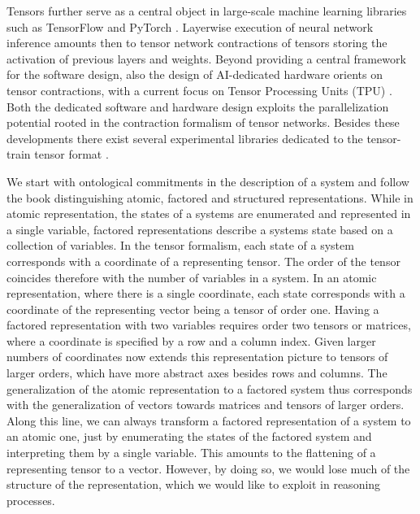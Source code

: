 Tensors further serve as a central object in large-scale machine learning libraries such as TensorFlow \cite{abadi_tensorflow_2016} and PyTorch \cite{paszke_pytorch_2019}.
Layerwise execution of neural network inference amounts then to tensor network contractions of tensors storing the activation of previous layers and weights.
Beyond providing a central framework for the software design, also the design of AI-dedicated hardware orients on tensor contractions, with a current focus on Tensor Processing Units (TPU) \cite{nikolic_survey_2022,jouppi_tpu_2023}.
Both the dedicated software and hardware design exploits the parallelization potential rooted in the contraction formalism of tensor networks.
Besides these developments there exist several experimental libraries dedicated to the tensor-train tensor format \cite{suess_mpnum_2017,wolf_libxerusxerus_2024,gels_pgelssscikit_tt_2025,puljak_tn4ml_2025}.


We start with ontological commitments in the description of a system and follow the book \cite{russell_artificial_2021} distinguishing atomic, factored and structured representations.
While in atomic representation, the states of a systems are enumerated and represented in a single variable, factored representations describe a systems state based on a collection of variables.
In the tensor formalism, each state of a system corresponds with a coordinate of a representing tensor.
The order of the tensor coincides therefore with the number of variables in a system.
In an atomic representation, where there is a single coordinate, each state corresponds with a coordinate of the representing vector being a tensor of order one.
Having a factored representation with two variables requires order two tensors or matrices, where a coordinate is specified by a row and a column index.
Given larger numbers of coordinates now extends this representation picture to tensors of larger orders, which have more abstract axes besides rows and columns.
The generalization of the atomic representation to a factored system thus corresponds with the generalization of vectors towards matrices and tensors of larger orders.
Along this line, we can always transform a factored representation of a system to an atomic one, just by enumerating the states of the factored system and interpreting them by a single variable.
This amounts to the flattening of a representing tensor to a vector.
However, by doing so, we would lose much of the structure of the representation, which we would like to exploit in reasoning processes.

